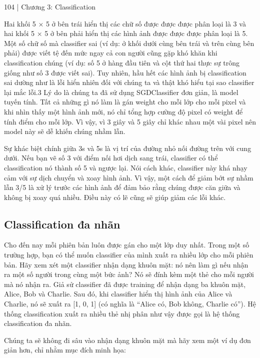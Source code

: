 104 | Chương 3: Classification

Hai khối 5 × 5 ở bên trái hiển thị các chữ số được được được phân loại là 3 và hai khối 5 × 5 ở bên phải hiển thị các hình ảnh được được được phân loại là 5. Một số chữ số mà classifier sai (ví dụ: ở khối dưới cùng bên trái và trên cùng bên phải) được viết tệ đến mức ngay cả con người cũng gặp khó khăn khi classification chúng (ví dụ: số 5 ở hàng đầu tiên và cột thứ hai thực sự trông giống như số 3 được viết sai). Tuy nhiên, hầu hết các hình ảnh bị classification sai dường như là lỗi hiển nhiên đối với chúng ta và thật khó hiểu tại sao classifier lại mắc lỗi.3 Lý do là chúng ta đã sử dụng SGDClassifier đơn giản, là model tuyến tính. Tất cả những gì nó làm là gán weight cho mỗi lớp cho mỗi pixel và khi nhìn thấy một hình ảnh mới, nó chỉ tổng hợp cường độ pixel có weight để tính điểm cho mỗi lớp. Vì vậy, vì 3 giây và 5 giây chỉ khác nhau một vài pixel nên model này sẽ dễ khiến chúng nhầm lẫn.

Sự khác biệt chính giữa 3s và 5s là vị trí của đường nhỏ nối đường trên với cung dưới. Nếu bạn vẽ số 3 với điểm nối hơi dịch sang trái, classifier có thể classification nó thành số 5 và ngược lại. Nói cách khác, classifier này khá nhạy cảm với sự dịch chuyển và xoay hình ảnh. Vì vậy, một cách để giảm bớt sự nhầm lẫn 3/5 là xử lý trước các hình ảnh để đảm bảo rằng chúng được căn giữa và không bị xoay quá nhiều. Điều này có lẽ cũng sẽ giúp giảm các lỗi khác.

\subsection{Classification đa nhãn}

Cho đến nay mỗi phiên bản luôn được gán cho một lớp duy nhất. Trong một số trường hợp, bạn có thể muốn classifier của mình xuất ra nhiều lớp cho mỗi phiên bản. Hãy xem xét một classifier nhận dạng khuôn mặt: nó nên làm gì nếu nhận ra một số người trong cùng một bức ảnh? Nó sẽ đính kèm một thẻ cho mỗi người mà nó nhận ra. Giả sử classifier đã được training để nhận dạng ba khuôn mặt, Alice, Bob và Charlie. Sau đó, khi classifier hiển thị hình ảnh của Alice và Charlie, nó sẽ xuất ra [1, 0, 1] (có nghĩa là “Alice có, Bob không, Charlie có”). Hệ thống classification xuất ra nhiều thẻ nhị phân như vậy được gọi là hệ thống classification đa nhãn.

Chúng ta sẽ không đi sâu vào nhận dạng khuôn mặt mà hãy xem một ví dụ đơn giản hơn, chỉ nhằm mục đích minh họa:

